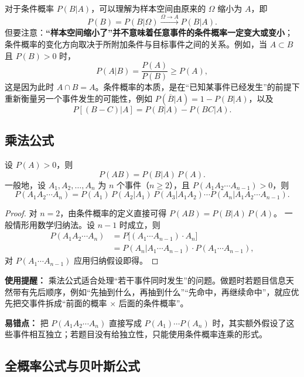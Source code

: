 ﻿\documentclass[lang=cn,11pt]{elegantbook}
\begin{document}
\begin{note}
对于条件概率 \(P(B|A)\)，可以理解为样本空间由原来的 \(\Omega\) 缩小为 \(A\)，即
\[
P(B) = P(B|\Omega) \xrightarrow{\Omega \to A} P(B|A).
\]
但要注意：\textbf{“样本空间缩小了”并不意味着任意事件的条件概率一定变大或变小}；条件概率的变化方向取决于所附加条件与目标事件之间的关系。例如，当 \(A\subset B\) 且 \(P(B)>0\) 时，
\[
P(A|B)=\frac{P(A)}{P(B)}\ge P(A),
\]
这是因为此时 \(A\cap B=A\)。条件概率的本质，是在“已知某事件已经发生”的前提下重新衡量另一个事件发生的可能性，例如 \(P(\overline{B}|A)=1-P(B|A)\)，以及
\[
P[(B-C)|A] = P(B|A) - P(BC|A).
\]
\end{note}

\subsection{乘法公式}

\begin{theorem}[乘法公式] \label{thm:multiplication}
设 \(P(A) > 0\)，则
\[
P(AB) = P(B|A)\,P(A).
\]
一般地，设 \(A_1, A_2, \dots, A_n\) 为 \(n\) 个事件（\(n \ge 2\)），且 \(P(A_1 A_2 \cdots A_{n-1}) > 0\)，则
\[
P(A_1 A_2 \cdots A_n) = P(A_1)\,P(A_2|A_1)\,P(A_3|A_1 A_2) \cdots P(A_n|A_1 A_2 \cdots A_{n-1}).
\]
\end{theorem}
\begin{proof}
对 \(n=2\)，由条件概率的定义直接可得 \(P(AB)=P(B|A)\,P(A)\)。
一般情形用数学归纳法。设 \(n-1\) 时成立，则
\begin{align*}
P(A_1 A_2 \cdots A_n) &= P\!\bigl[(A_1 \cdots A_{n-1}) \cdot A_n\bigr] \\
&= P(A_n | A_1 \cdots A_{n-1}) \cdot P(A_1 \cdots A_{n-1}),
\end{align*}
对 \(P(A_1 \cdots A_{n-1})\) 应用归纳假设即得。
\end{proof}

\begin{note}
\textbf{使用提醒：} 乘法公式适合处理“若干事件同时发生”的问题。做题时若题目信息天然带有先后顺序，例如“先抽到什么，再抽到什么”“先命中，再继续命中”，就应优先把交事件拆成“前面的概率 \(\times\) 后面的条件概率”。

\textbf{易错点：} 把 \(P(A_1A_2\cdots A_n)\) 直接写成 \(P(A_1)\cdots P(A_n)\) 时，其实额外假设了这些事件相互独立；若题目没有给独立性，只能使用条件概率连乘的形式。
\end{note}

\subsection{全概率公式与贝叶斯公式}
\end{document}
